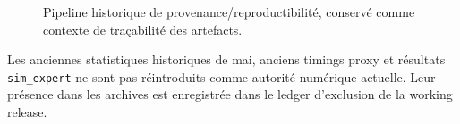 \begin{figure}[!t]
\centering

\caption{Pipeline historique de provenance/reproductibilité, conservé comme contexte de traçabilité des artefacts.}
\label{fig:legacy-provenance}
\end{figure}

Les anciennes statistiques historiques de mai, anciens timings proxy et résultats \texttt{sim\_expert} ne sont pas réintroduits comme autorité numérique actuelle. Leur présence dans les archives est enregistrée dans le ledger d'exclusion de la working release.
